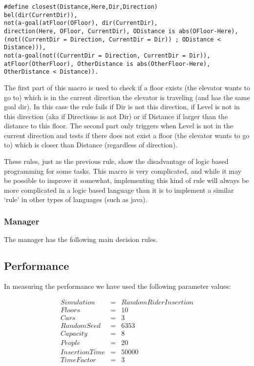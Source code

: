 \documentclass[a4paper,11pt]{article}
\begin{document}
\begin{verbatim}
#define closest(Distance,Here,Dir,Direction)
bel(dir(CurrentDir)), 
not(a-goal(atFloor(OFloor), dir(CurrentDir), 
direction(Here, OFloor, CurrentDir), ODistance is abs(OFloor-Here),
(not((CurrentDir = Direction, CurrentDir = Dir)) ; ODistance < Distance))),
not(a-goal(not((CurrentDir = Direction, CurrentDir = Dir)), 
atFloor(OtherFloor), OtherDistance is abs(OtherFloor-Here), OtherDistance < Distance)).
\end{verbatim}

The first part of this macro is used to check if a floor exists (the elevator wants to go to) which is in the current direction the elevator is traveling (and has the same goal dir). In this case the rule fails if Dir is not this direction, if Level is not in this direction (aka if Directions is not Dir) or if Distance if larger than the distance to this floor. The second part only triggers when Level is not in the current direction and tests if there does not exist a floor (the elevator wants to go to) which is closer than Distance (regardless of direction).

These rules, just as the previous rule, show the disadvantage of logic based programming for some tasks. This macro is very complicated, and while it may be possible to improve it somewhat, implementing this kind of rule will always be more complicated in a logic based language than it is to implement a similar `rule' in other types of languages (such as java).

\subsubsection{Manager}
The manager has the following main decision rules.

\subsection{Performance}
In measuring the performance we have used the following parameter values:

\[\begin{array}{lcl}
Simulation & = & Random Rider Insertion\\
Floors & = & 10\\
Cars & = & 3\\
RandomSeed & = & 6353\\
Capacity & = & 8\\
People & = & 20\\
InsertionTime & = & 50000\\
TimeFactor & = & 3
\end{array}\] 
\end{document}
